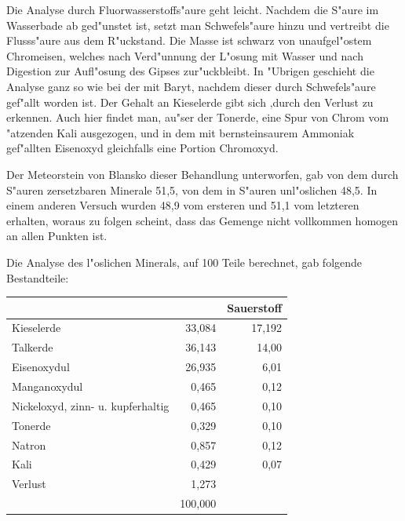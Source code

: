 \documentclass[a4paper, 11pt, oneside]{article}
\begin{document}
Die Analyse durch Fluorwasserstoffs"aure geht leicht. Nachdem die S"aure im Wasserbade ab ged"unstet ist, setzt man Schwefels"aure hinzu und vertreibt die Flusss"aure aus dem R"uckstand. Die Masse ist schwarz von unaufgel"ostem Chromeisen, welches nach Verd"unnung der L"osung mit Wasser und nach Digestion zur Aufl"osung des Gipses zur"uckbleibt. In "Ubrigen geschieht die Analyse ganz so wie bei der mit Baryt, nachdem dieser durch Schwefels"aure gef"allt worden ist. Der Gehalt an Kieselerde gibt sich ‚durch den Verlust zu erkennen. Auch hier findet man, au"ser der Tonerde, eine Spur von Chrom vom "atzenden Kali ausgezogen, und in dem mit bernsteinsaurem Ammoniak gef"allten Eisenoxyd gleichfalls eine Portion Chromoxyd.

Der Meteorstein von Blansko dieser Behandlung unterworfen, gab von dem durch S"auren zersetzbaren Minerale 51,5, von dem in S"auren unl"oslichen 48,5. In einem anderen Versuch wurden 48,9 vom ersteren und 51,1 vom letzteren erhalten, woraus zu folgen scheint, dass das Gemenge nicht vollkommen homogen an allen Punkten ist.

Die Analyse des l"oslichen Minerals, auf 100 Teile berechnet, gab folgende Bestandteile:
\begin{center}
\begin{tabular}{ |l|r|r| }
    \hline
     & & Sauerstoff\\\hline
    Kieselerde & 33,084 & 17,192\\\hline
    Talkerde & 36,143 & 14,00\\\hline
    Eisenoxydul & 26,935 & 6,01\\\hline
    Manganoxydul & 0,465 & 0,12\\\hline
    Nickeloxyd, zinn- u. kupferhaltig & 0,465 & 0,10\\\hline
    Tonerde & 0,329 & 0,10\\\hline
    Natron & 0,857 & 0,12\\\hline
    Kali & 0,429 & 0,07\\\hline
    Verlust & 1,273 & \\\hline
     & 100,000 & \\
    \hline
\end{tabular}
\end{center}
\end{document}
